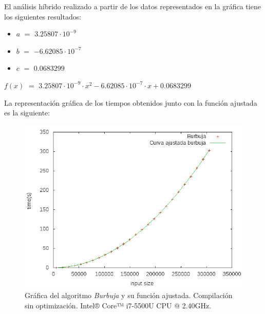 \documentclass[11pt,a4paper]{article}
\begin{document}
\newpage

				\par
				El análisis híbrido realizado a partir de los datos representados en la gráfica tiene los siguientes resultados:

				\begin{itemize}

					\item
					$a$ $=$ $3.25807\cdot 10^{-9}$
					\item
					$b$ $=$ $-6.62085\cdot 10^{-7}$
					\item
					$c$ $=$ $0.0683299$

				\end{itemize}

				\par
				$f(x)$ $=$ $ 3.25807\cdot 10^{-9}\cdot x^2 - 6.62085\cdot 10^{-7}\cdot x+ 0.0683299$

				\vspace{5mm}

				\par
				La representación gráfica de los tiempos obtenidos junto con la función ajustada es la siguiente:

				\begin{figure}[h]

					\centering
					\includegraphics[width=1\textwidth]{burbuja_ajustado.png}
					\caption{Gráfica del algoritmo \textit{Burbuja} y su función ajustada. Compilación sin optimización. Intel® Core™ i7-5500U CPU @ 2.40GHz.}

				\end{figure}
\end{document}
